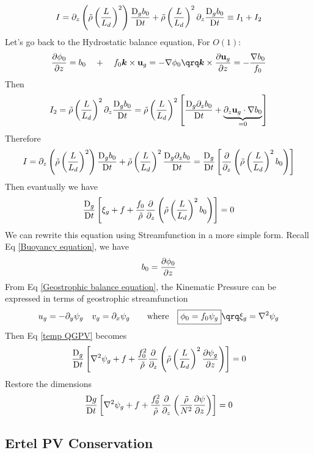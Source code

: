 \documentclass[../SQG_notes.tex]{subfiles}
\begin{document}
    \[ I = \partial_z \left(\tilde{\rho} \left(\frac{L}{L_d}\right)^2\right) \frac{\mathrm{D}_g b_0}{\mathrm{D} t} + \tilde{\rho} \left(\frac{L}{L_d}\right)^2 \partial_z \frac{\mathrm{D}_g b_0}{\mathrm{D} t} \equiv I_1 + I_2\]
    Let's go back to the Hydrostatic balance equation, 
    For $O(1)$:
    \[ \frac{\p \phi_0}{\p z} = b_0 \quad + \quad f_0 \bm{k} \times \bu_g = -\nabla \phi_0 \qrq \bm{k} \times \frac{\p \bu_g}{\p z} = -\frac{\nabla b_0}{f_0}\]
    Then 
    \[ I_2  =\tilde{\rho} \left(\frac{L}{L_d}\right)^2 \partial_z \frac{\mathrm{D}_g b_0}{\mathrm{D} t}= \tilde{\rho} \left(\frac{L}{L_d}\right)^2 \left[\frac{\mathrm{D}_g \partial_z b_0}{\mathrm{D} t} + \underbrace{\partial_z \mathbf{u}_g \cdot \nabla b_0}_{ = 0}\right]\]
    Therefore
    \[ I = \partial_z \left(\tilde{\rho} \left(\frac{L}{L_d}\right)^2\right) \frac{\mathrm{D}_g b_0}{\mathrm{D} t} +  \tilde{\rho} \left(\frac{L}{L_d}\right)^2 \frac{\mathrm{D}_g \partial_z b_0}{\mathrm{D} t} = \frac{\mathrm{D}_g}{\mathrm{D} t} \left[\frac{\partial}{\partial_z}\left(\tilde{\rho} \left(\frac{L}{L_d}\right)^2 b_0\right)\right]\]
    Then evantually we have 
    \begin{equation}
        \frac{\mathrm{D}_g}{\mathrm{D} t} \left[ \xi_g + f + \frac{f_0}{\tilde{\rho}}\frac{\partial}{\partial_z}\left(\tilde{\rho} \left(\frac{L}{L_d}\right)^2 b_0\right)\right] = 0 \label{temp QGPV}
    \end{equation}
    We can rewrite this equation using Streamfunction in a more simple form. Recall Eq \ref{Buoyancy equation}, we have 
    \[ b_0 = \frac{\partial \phi_0}{\partial z}\]
    From Eq \ref{Geostrophic balance equation}, the Kinematic Pressure can be expressed in terms of geostrophic streamfunction 
    \[ u_g = -\p_y \psi_g \quad v_g = \p_x \psi_g \qquad \text{where} \quad \boxed{\phi_0 = f_0 \psi_g} \qrq \xi_g = \nabla^2 \psi_g\]
    Then Eq \ref{temp QGPV} becomes 
    \begin{equation}
         \frac{\mathrm{D}_g}{\mathrm{D} t} \left[ \nabla^2 \psi_g + f + \frac{f_0^2}{\tilde{\rho}}\frac{\partial}{\partial_z}\left(\tilde{\rho} \left(\frac{L}{L_d}\right)^2 \frac{\partial \psi_g}{\partial z}\right)\right] = 0 \label{dimensionless QGPV}
    \end{equation}
    Restore the dimensions
    \begin{equation}
        \frac{\mathrm{D} g}{\mathrm{D} t} \left[ \nabla^2 \psi_g + f + \frac{f_0^2}{\tilde{\rho}}\frac{\partial }{\partial_z} \left( \frac{\tilde{\rho}}{N^2} \frac{\partial \psi}{\partial z}\right)\right] = 0 \label{QGPV equation}
    \end{equation}

    \subsection{Ertel PV Conservation}
\end{document}
